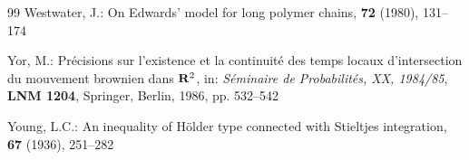 \documentclass[a4paper,11pt]{article}
\begin{document}
\begin{thebibliography}{99}
Westwater, J.:
\newblock On {E}dwards' model for long polymer chains,
 {\bf 72} (1980), 131--174

Yor, M.:
\newblock Pr\'ecisions sur l'existence et la continuit\'e des temps 
locaux d'intersection du mouvement brownien dans {${\bf R}\sp 2$},
\newblock in: {\em S\'eminaire de Probabilit\'es, XX, 1984/85}, 
{\bf LNM 1204}, Springer, Berlin, 1986, pp. 532--542

Young, L.C.:
\newblock An inequality of {H}\"older type connected with 
{S}tieltjes integration,
 {\bf 67} (1936), 251--282


\end{thebibliography}
\end{document}
